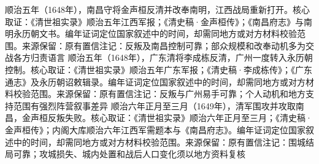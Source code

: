 顺治五年（1648年），南昌守将金声桓反清并改奉南明，江西战局重新打开。核心取证：《清世祖实录》顺治五年江西军报；《清史稿·金声桓传》；《南昌府志》与南明永历朝文书。编年证词定位国家叙述中的时间，却需同地方或对方材料校验范围。来源保留：原有置信注记：反叛及南昌控制可靠；部众规模和改奉动机多为交战各方归责语言
顺治五年（1648年），广东清将李成栋反清，广州一度转入永历朝控制。核心取证：《清世祖实录》顺治五年广东军报；《清史稿·李成栋传》；《广东通志》及永历朝诏敕辑录。编年证词定位国家叙述中的时间，却需同地方或对方材料校验范围。来源保留：原有置信注记：反叛与广州易手可靠；个人动机和地方支持范围有强烈阵营叙事差异
顺治六年正月至三月（1649年），清军围攻并攻取南昌，金声桓反叛失败。核心取证：《清世祖实录》顺治六年正月至三月；《清史稿·金声桓传》；内阁大库顺治六年江西军需题本与《南昌府志》。编年证词定位国家叙述中的时间，却需同地方或对方材料校验范围。来源保留：原有置信注记：围城结局可靠；攻城损失、城内处置和战后人口变化须以地方资料复核
